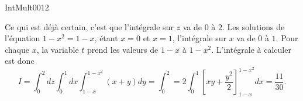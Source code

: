 
\begin{corrige}{IntMult0012}

	Ce qui est déjà certain, c'est que l'intégrale sur $z$ va de $0$ à $2$. Les solutions de l'équation $1-x^2=1-x$, étant $x=0$ et $x=1$, l'intégrale sur $x$ va de $0$ à $1$. Pour chaque $x$, la variable $t$ prend les valeurs de $1-x$ à $1-x^2$. L'intégrale à calculer est donc
	\begin{equation}
		I=\int_0^2dz\int_0^1dx\int_{1-x}^{1-x^2}(x+y)dy=\int_0^2=2\int_0^1\left[ xy+\frac{ y^2 }{2} \right]_{1-x}^{1-x^2}dx=\frac{ 11 }{ 30 }.
	\end{equation}
	
\end{corrige}

